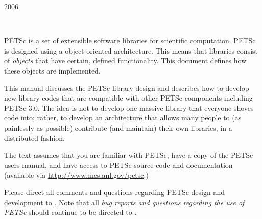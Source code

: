 \documentclass[twoside,12pt]{../sty/report_petsc}
\begin{document}
{}{2006}

\newpage

\hbox{ }

\vspace{1in}
\date{\today}


\newpage



\medskip \medskip


%
%

\medskip \medskip
PETSc is 
a set of extensible software libraries for scientific computation.
PETSc is designed using a object-oriented
architecture. This means that libraries consist of {\em objects} that
have certain, defined functionality. This document defines how these
objects are implemented.

This manual discusses the PETSc library design and describes
how to develop new library codes that are compatible with other PETSc components 
including PETSc 3.0.
The idea is not to develop one massive library that everyone shoves code 
into; rather, to develop an architecture that allows many people
to (as painlessly as possible) contribute (and maintain) their own libraries,
in a distributed fashion.

The text assumes
that you are familiar with PETSc, have a copy of the PETSc users
manual, and have access to PETSc source code and documentation
(available via \href{http://www.mcs.anl.gov/petsc}{http://www.mcs.anl.gov/petsc}.)


\vspace{1cm}

Please direct all comments and questions regarding PETSc design and
development to .  Note that all {\em
bug reports and questions regarding the use of PETSc} should continue
to be directed to .

%
%
\end{document}
